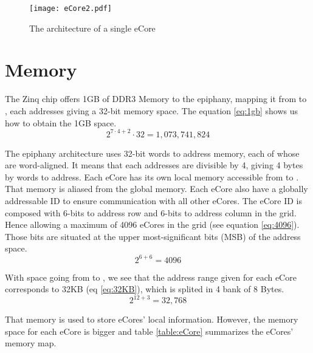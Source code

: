 \begin{figure}[h!]
\centering
\texttt{[image: eCore2.pdf]}
\caption{The architecture of a single \gls{eCore}}
\label{fig eCore}
\end{figure}

\section{Memory} \label{memory}
The Zinq chip offers 1GB of DDR3 Memory to the \gls{epiphany}, mapping it from  to , each addresses giving a 32-bit memory space. The equation \ref{eq:1gb} shows us how to obtain the 1GB space.
\begin{equation}
	2^{7\cdot4+2} \cdot 32 = 1,073,741,824
\label{eq:1gb}
\end{equation}

The \gls{epiphany} architecture uses 32-bit words to address memory, each of whose are word-aligned. It means that each addresses are divisible by 4, giving 4 bytes by words to address.
Each \gls{eCore} has its own local memory accessible from  to . That memory is aliased from the global memory. Each eCore also have a globally addressable ID to ensure communication with all other \glspl{eCore}. The \gls{eCore} ID is composed with 6-bits to address row and 6-bits to address column in the grid. Hence allowing a maximum of 4096 \glspl{eCore} in the grid (see equation \ref{eq:4096}). Those bits are situated at the upper most-significant bits (MSB) of the address space.
\begin{equation}
	2^{6+6} = 4096
\label{eq:4096}
\end{equation}

With space going from  to , we see that the address range given for each \gls{eCore} corresponds to 32KB (eq \ref{eq:32KB}), which is splited in 4 bank of 8 Bytes.
\begin{equation}
	2^{12+3} = 32,768
\label{eq:32KB}
\end{equation}

That memory is used to store \glspl{eCore}' local information. However, the memory space for each \gls{eCore} is bigger and table \ref{table:eCore}\cite{epiphanyArch} summarizes the \glspl{eCore}' memory map.

